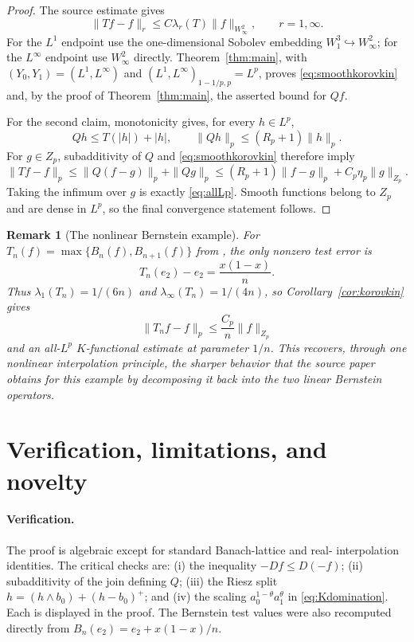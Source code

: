 \documentclass[11pt]{article}
\newtheorem{remark}[theorem]{Remark}
\newcommand{\Dop}{D}
\newcommand{\Qop}{Q}
\begin{document}
\begin{proof}
The source estimate \cite[Theorem~2]{GN} gives
\[
 \|Tf-f\|_r\leq C\lambda_r(T)\|f\|_{W_\infty^2},
 \qquad r=1,\infty.
\]
For the $L^1$ endpoint use the one-dimensional Sobolev embedding
$W_1^3\hookrightarrow W_\infty^2$; for the $L^\infty$ endpoint use
$W_\infty^2$ directly. Theorem~\ref{thm:main}, with
$(Y_0,Y_1)=(L^1,L^\infty)$ and
$(L^1,L^\infty)_{1-1/p,p}=L^p$, proves
\eqref{eq:smoothkorovkin} and, by the proof of
Theorem~\ref{thm:main}, the asserted bound for $\Qop f$.

For the second claim, monotonicity gives, for every $h\in L^p$,
\[
 \Qop h\leq T(|h|)+|h|,
 \qquad
 \|\Qop h\|_p\leq(R_p+1)\|h\|_p.
\]
For $g\in Z_p$, subadditivity of $\Qop$ and
\eqref{eq:smoothkorovkin} therefore imply
\[
 \|Tf-f\|_p
 \leq\|\Qop(f-g)\|_p+\|\Qop g\|_p
 \leq(R_p+1)\|f-g\|_p+C_p\eta_p\|g\|_{Z_p}.
\]
Taking the infimum over $g$ is exactly \eqref{eq:allLp}. Smooth functions
belong to $Z_p$ and are dense in $L^p$, so the final convergence statement
follows.
\end{proof}

\begin{remark}[The nonlinear Bernstein example]
For $T_n(f)=\max\{B_n(f),B_{n+1}(f)\}$ from \cite[Example~1]{GN},
the only nonzero test error is
\[
 T_n(e_2)-e_2=\frac{x(1-x)}n.
\]
Thus $\lambda_1(T_n)=1/(6n)$ and
$\lambda_\infty(T_n)=1/(4n)$, so Corollary~\ref{cor:korovkin} gives
\[
 \|T_n f-f\|_p\leq \frac{C_p}{n}\|f\|_{Z_p}
\]
and an all-$L^p$ $K$-functional estimate at parameter $1/n$. This recovers,
through one nonlinear interpolation principle, the sharper behavior that the
source paper obtains for this example by decomposing it back into the two
linear Bernstein operators.
\end{remark}

\section{Verification, limitations, and novelty}

\paragraph{Verification.}
The proof is algebraic except for standard Banach-lattice and real-
interpolation identities. The critical checks are: (i) the inequality
$-\Dop f\leq\Dop(-f)$; (ii) subadditivity of the join defining $\Qop$;
(iii) the Riesz split $h=(h\wedge b_0)+(h-b_0)^+$; and (iv) the scaling
$a_0^{1-\theta}a_1^\theta$ in \eqref{eq:Kdomination}. Each is displayed in
the proof. The Bernstein test values were also recomputed directly from
$B_n(e_2)=e_2+x(1-x)/n$.
\end{document}
